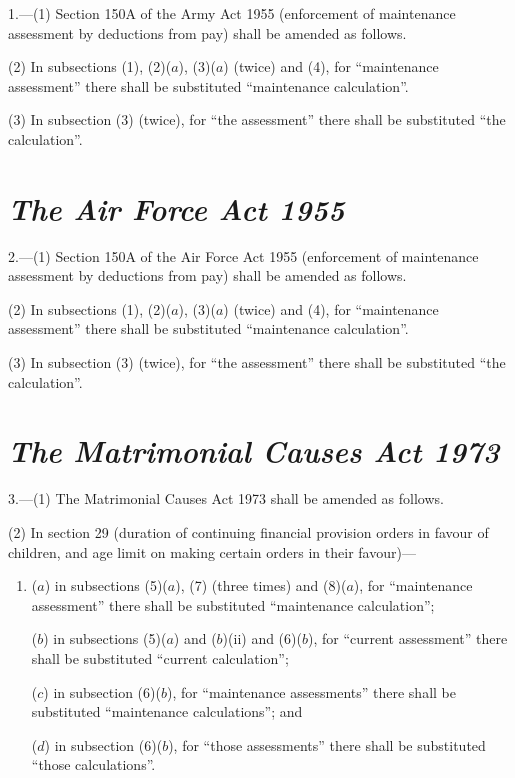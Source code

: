 \documentclass[12pt,a4paper]{article}
\begin{document}
1.---(1) Section 150A of the Army Act 1955 (enforcement of maintenance assessment by deductions from pay) shall be amended as follows.

(2) In subsections (1), (2)($a$), (3)($a$)  (twice) and (4), for “maintenance assessment” there shall be substituted “maintenance calculation”.

(3) In subsection (3)  (twice), for “the assessment” there shall be substituted “the calculation”.


\section*{\itshape The Air Force Act 1955}

2.---(1) Section 150A of the Air Force Act 1955 (enforcement of maintenance assessment by deductions from pay) shall be amended as follows.

(2) In subsections (1), (2)($a$), (3)($a$)  (twice) and (4), for “maintenance assessment” there shall be substituted “maintenance calculation”.

(3) In subsection (3)  (twice), for “the assessment” there shall be substituted “the calculation”.


\section*{\itshape The Matrimonial Causes Act 1973}

3.---(1) The Matrimonial Causes Act 1973 shall be amended as follows.

(2) In section 29 (duration of continuing financial provision orders in favour of children, and age limit on making certain orders in their favour)—
\begin{enumerate}\item[]
($a$) in subsections (5)($a$), (7)  (three times) and (8)($a$), for “maintenance assessment” there shall be substituted “maintenance calculation”;

($b$) in subsections (5)($a$)  and ($b$)(ii)  and (6)($b$), for “current assessment” there shall be substituted “current calculation”;

($c$) in subsection (6)($b$), for “maintenance assessments” there shall be substituted “maintenance calculations”; and

($d$) in subsection (6)($b$), for “those assessments” there shall be substituted “those calculations”.
\end{enumerate}
\end{document}
